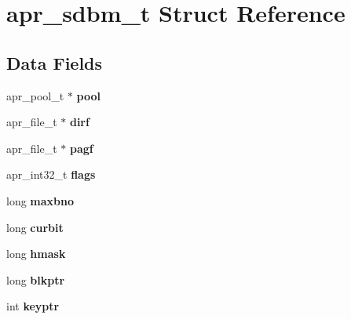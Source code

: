 \hypertarget{structapr__sdbm__t}{\section{apr\-\_\-sdbm\-\_\-t Struct Reference}
\label{structapr__sdbm__t}
}
\subsection*{Data Fields}
\begin{DoxyCompactItemize}
\item 
\hypertarget{structapr__sdbm__t_a34ad1ed73a9ed80dc407fc739206c507}{apr\-\_\-pool\-\_\-t $\ast$ {\bfseries pool}}\label{structapr__sdbm__t_a34ad1ed73a9ed80dc407fc739206c507}

\item 
\hypertarget{structapr__sdbm__t_a77eb27955ee58d2f4fb524c3c7c3e33c}{apr\-\_\-file\-\_\-t $\ast$ {\bfseries dirf}}\label{structapr__sdbm__t_a77eb27955ee58d2f4fb524c3c7c3e33c}

\item 
\hypertarget{structapr__sdbm__t_a4641e6dc78427953a65e325a3efe1586}{apr\-\_\-file\-\_\-t $\ast$ {\bfseries pagf}}\label{structapr__sdbm__t_a4641e6dc78427953a65e325a3efe1586}

\item 
\hypertarget{structapr__sdbm__t_ad89f5c1b03a5ceb684479c076657911f}{apr\-\_\-int32\-\_\-t {\bfseries flags}}\label{structapr__sdbm__t_ad89f5c1b03a5ceb684479c076657911f}

\item 
\hypertarget{structapr__sdbm__t_a50333e4412f821cc24de74404b5bf633}{long {\bfseries maxbno}}\label{structapr__sdbm__t_a50333e4412f821cc24de74404b5bf633}

\item 
\hypertarget{structapr__sdbm__t_ae3102fdf2ba9f497283e9f407c8306b6}{long {\bfseries curbit}}\label{structapr__sdbm__t_ae3102fdf2ba9f497283e9f407c8306b6}

\item 
\hypertarget{structapr__sdbm__t_ade5599e60f57f4248540883949ac0316}{long {\bfseries hmask}}\label{structapr__sdbm__t_ade5599e60f57f4248540883949ac0316}

\item 
\hypertarget{structapr__sdbm__t_aabe75f218da54bc933e6b408b0bd58c8}{long {\bfseries blkptr}}\label{structapr__sdbm__t_aabe75f218da54bc933e6b408b0bd58c8}

\item 
\hypertarget{structapr__sdbm__t_aee21c0ca0f0507c01168e60be0aeb8fa}{int {\bfseries keyptr}}\label{structapr__sdbm__t_aee21c0ca0f0507c01168e60be0aeb8fa}


\end{DoxyCompactItemize}
